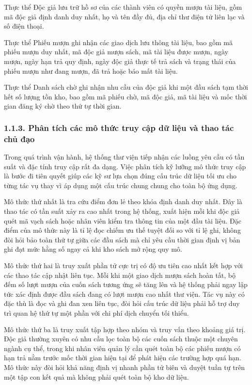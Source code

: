 \documentclass[14pt,a4paper]{extarticle}
\begin{document}
Thực thể Độc giả lưu trữ hồ sơ của các thành viên có quyền mượn tài liệu, gồm mã độc giả định danh duy nhất, họ và tên đầy đủ, địa chỉ thư điện tử liên lạc và số điện thoại.

Thực thể Phiếu mượn ghi nhận các giao dịch lưu thông tài liệu, bao gồm mã phiếu mượn duy nhất, mã độc giả mượn sách, mã tài liệu được mượn, ngày mượn, ngày hạn trả quy định, ngày độc giả thực tế trả sách và trạng thái của phiếu mượn như đang mượn, đã trả hoặc báo mất tài liệu.

Thực thể Danh sách chờ ghi nhận nhu cầu của độc giả khi một đầu sách tạm thời hết số lượng tồn kho, bao gồm mã phiếu chờ, mã độc giả, mã tài liệu và mốc thời gian đăng ký chờ theo thứ tự thời gian.

\subsubsection*{1.1.3. Phân tích các mô thức truy cập dữ liệu và thao tác chủ đạo}

Trong quá trình vận hành, hệ thống thư viện tiếp nhận các luồng yêu cầu có tần suất và đặc tính truy cập rất đa dạng. Việc phân tích kỹ lưỡng mô thức truy cập là bước đi tiên quyết giúp các kỹ sư lựa chọn đúng cấu trúc dữ liệu tối ưu cho từng tác vụ thay vì áp dụng một cấu trúc chung chung cho toàn bộ ứng dụng.

Mô thức thứ nhất là tra cứu điểm đơn lẻ theo khóa định danh duy nhất. Đây là thao tác có tần suất xảy ra cao nhất trong hệ thống, xuất hiện mỗi khi độc giả quét mã vạch sách hoặc nhân viên kiểm tra thông tin của một đầu tài liệu. Đặc điểm của mô thức này là tỉ lệ đọc chiếm ưu thế tuyệt đối so với tỉ lệ ghi, không đòi hỏi bảo toàn thứ tự giữa các đầu sách mà chỉ yêu cầu thời gian định vị bản ghi đạt mức hằng số ngay cả khi kho sách mở rộng quy mô.

Mô thức thứ hai là truy xuất phần tử cực trị có độ ưu tiên cao nhất kết hợp với các thao tác cập nhật liên tục. Mỗi khi một giao dịch mượn sách hoàn tất, bộ đếm số lượt mượn của cuốn sách tương ứng sẽ tăng lên và hệ thống phải ngay lập tức xác định được đầu sách đang có lượt mượn cao nhất thư viện. Tác vụ này có đặc thù là đọc và ghi đan xen liên tục, đòi hỏi cấu trúc dữ liệu phải hỗ trợ duy trì quan hệ thứ tự một phần với chi phí dịch chuyển tối thiểu.

Mô thức thứ ba là truy xuất tập hợp theo nhóm và truy vấn theo khoảng giá trị. Độc giả thường xuyên có nhu cầu lọc toàn bộ các cuốn sách thuộc một chuyên ngành cụ thể, trong khi nhân viên quản lý cần quét toàn bộ các phiếu mượn có hạn trả nằm trước mốc thời gian hiện tại để phát hiện các trường hợp quá hạn. Mô thức này đòi hỏi khả năng định vị nhanh phần tử biên và duyệt tuần tự trên một tập con kết quả mà không phải quét toàn bộ kho dữ liệu.
\end{document}
